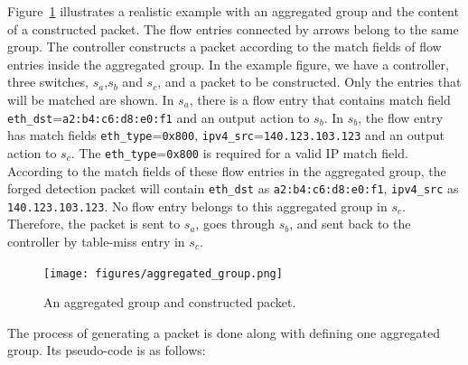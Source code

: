 Figure~\ref{aggregated_group} illustrates a realistic example with an aggregated group and the content of a constructed packet. The flow entries connected by arrows belong to the same group. The controller constructs a packet according to the match fields of flow entries inside the aggregated group. In the example figure, we have a controller, three switches, $s_a$,$s_b$ and $s_c$, and a packet to be constructed. Only the entries that will be matched are shown. In $s_a$, there is a flow entry that contains match field \texttt{eth\_dst}=\texttt{a2:b4:c6:d8:e0:f1} and an output action to $s_b$. In $s_b$, the flow entry has match fields \texttt{eth\_type}=\texttt{0x800}, \texttt{ipv4\_src}=\texttt{140.123.103.123} and an output action to $s_c$. The \texttt{eth\_type}=\texttt{0x800} is required for a valid IP match field. According to the match fields of these flow entries in the aggregated group, the forged detection packet will contain \texttt{eth\_dst} as \texttt{a2:b4:c6:d8:e0:f1}, \texttt{ipv4\_src} as \texttt{140.123.103.123}. No flow entry belongs to this aggregated group in $s_c$. Therefore, the packet is sent to $s_a$, goes through $s_b$, and sent back to the controller by table-miss entry in $s_c$. 

\begin{figure}[H]
\begin{center}
\texttt{[image: figures/aggregated\_group.png]}
\end{center}
\caption{An aggregated group and constructed packet. }
\label{aggregated_group}
\end{figure}

The process of generating a packet is done along with defining one aggregated group. Its pseudo-code is as follows:

